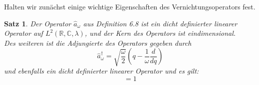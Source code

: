 \documentclass[11pt,a4paper,leqno]{report}
\newtheorem{proposition}{Satz}[chapter]
\numberwithin{equation}{chapter}
\begin{document}
\noindent
Halten wir zun\"achst einige wichtige Eigenschaften des 
Vernichtungsoperators fest.
\begin{proposition}
	Der Operator $\hat{a}_\omega$ aus Definition 6.8 ist ein dicht definierter linearer Operator auf $L^2(\mathbb{R}, \mathbb{C},\lambda)$, und der Kern des Operators ist eindimensional.\\
	Des weiteren ist die Adjungierte des Operators gegeben durch 
	\begin{equation}
		\hat{a}_\omega^\dagger = \sqrt{\frac{\omega}{2}}(q - \frac{1}{\omega}\frac{d}{dq})
	\end{equation}
	und ebenfalls ein dicht definierter linearer Operator und es gilt:
	\begin{equation}
		[\hat{a}_\omega, \hat{a}_\omega^\dagger] = 1
	\end{equation}
\end{proposition}
\end{document}
